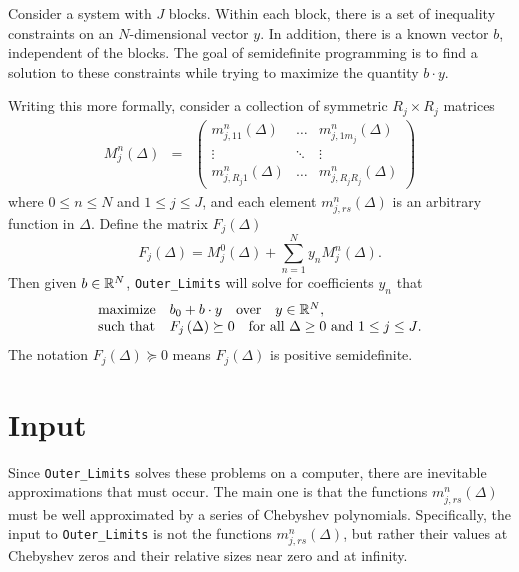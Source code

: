 \documentclass[12pt]{article}
\numberwithin{equation}{section}
\begin{document}
Consider a system with $J$ blocks.  Within each block, there is a set
of inequality constraints on an $N$-dimensional vector $y$.  In
addition, there is a known vector $b$, independent of the blocks.  The
goal of semidefinite programming is to find a solution to these
constraints while trying to maximize the quantity $b\cdot y$.

Writing this more formally, consider a collection of symmetric $R_{j}\times R_{j}$ matrices
\begin{eqnarray}
\label{eq:sdp}
M_j^n(\Delta) &=& \begin{pmatrix}
m_{j,11}^{n}(\Delta) & \dots & m_{j,1m_j}^{n}(\Delta)\\
\vdots & \ddots & \vdots\\
m_{j,R_j1}^{n}(\Delta) & \dots & m^{n}_{j,R_jR_j}(\Delta)
\end{pmatrix}
\end{eqnarray}
where $0 \leq n \leq N$ and $1 \leq j \leq J$, and each element
$m_{j,rs}^{n}(\Delta)$ is an arbitrary function in $\Delta$.  Define
the matrix $F_j\left(\Delta\right)$
\begin{equation}
F_j\left(\Delta\right)=M^0_j(\Delta)+\sum_{n=1}^{N} y_n M^n_j(\Delta).
\end{equation}
Then given $b\in \mathbb{R}^N$, \texttt{Outer\_Limits} will solve for coefficients $y_n$
that
\begin{eqnarray}
\label{eq:SDPconstraints}
\begin{array}{ll}
\textrm{maximize} & b_0+b\cdot y\quad\textrm{over}\quad y \in \mathbb{R}^N,\\
\textrm{such that} & F_j\left(\Delta\right) \succeq 0 \quad \textrm{for all $\Delta\geq 0$ and $1 \leq j \leq J$}.
\end{array}
\end{eqnarray}
The notation $F_j\left(\Delta\right)\succeq 0$ means $F_j\left(\Delta\right)$ is positive semidefinite.

\section{Input}
\label{sec:input}

Since \texttt{Outer\_Limits} solves these problems on a computer,
there are inevitable approximations that must occur.  The main one is
that the functions $m_{j,rs}^{n}(\Delta)$ must be well approximated by
a series of Chebyshev polynomials.  Specifically, the input to
\texttt{Outer\_Limits} is not the functions $m_{j,rs}^{n}(\Delta)$,
but rather their values at Chebyshev zeros and their relative sizes
near zero and at infinity.
\end{document}
